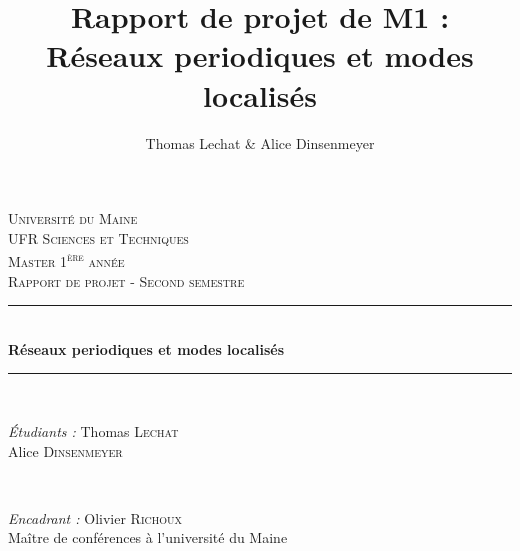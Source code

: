 \documentclass[a4paper]{report}
\title{Rapport de projet de M1 : \\ Réseaux periodiques et modes localisés }
\author{Thomas Lechat \& Alice Dinsenmeyer}
\begin{document}
\begin{titlepage}

\newcommand{\HRule}{\rule{\linewidth}{0.5mm}} %

\center %
 
 

\textsc{\large Université du Maine \\ UFR Sciences et Techniques}\\[0.5cm] %

\textsc{\Large Master 1\textsuperscript{ère} année}\\[1.0cm] %
\textsc{\large Rapport de projet - Second semestre}\\[0.5cm] %
\bigskip \bigskip


\HRule \\[0.6cm]
{ \bfseries \huge  Réseaux periodiques et modes localisés}\\[0.4cm] %
\HRule \\[1.5cm]
 

\begin{minipage}{0.4\textwidth}
\begin{flushleft} \large
\emph{Étudiants :} \newline \newline
\large Thomas \textsc{\large Lechat}\\
\large Alice \textsc{\large Dinsenmeyer}\\
\end{flushleft}
\end{minipage}
~
\begin{minipage}{0.4\textwidth}
\begin{flushright} \large
\emph{Encadrant :} \newline \newline
\large Olivier \textsc{\large Richoux}\\
Maître de conférences à l'université du Maine
\end{flushright}
\end{minipage}\\[4cm]


\end{titlepage}
\end{document}
